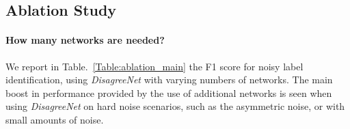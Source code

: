 \documentclass{article}
\begin{document}
\vspace{-.5em}
\subsection{Ablation Study}
\label{sec:ablation}
\vspace{-0.2em}

\paragraph{How many networks are needed?} We report in Table.~\ref{Table:ablation_main} the F1 score for noisy label identification, using \emph{DisagreeNet} with varying numbers of networks. %
The main boost in performance provided by the use of additional networks is seen when using \emph{DisagreeNet} on hard noise scenarios, such as the asymmetric noise, or with small amounts of noise.
\end{document}
